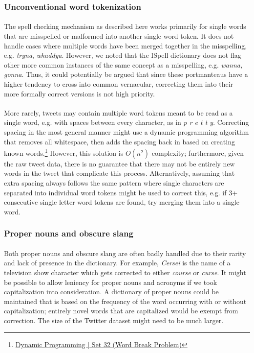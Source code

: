 \documentclass[twocolumn,10pt]{article}
\begin{document}
\subsubsection*{Unconventional word tokenization}
\paragraph{} The spell checking mechanism as described here works primarily for single words that are misspelled or malformed into another single word token. It does not handle cases where multiple words have been merged together in the misspelling, e.g. \textit{tryna}, \textit{whaddya}. However, we noted that the ISpell dictionary does not flag other more common instances of the same concept as a misspelling, e.g. \textit{wanna, gonna}. Thus, it could potentially be argued that since these portmanteaus have a higher tendency to cross into common vernacular, correcting them into their more formally correct versions is not high priority.
\paragraph{} More rarely, tweets may contain multiple word tokens meant to be read as a single word, e.g. with spaces between every character, as in \textit{p r e t t y}. Correcting spacing in the most general manner might use a dynamic programming algorithm that removes all whitespace, then adds the spacing back in based on creating known words.\footnote{\href{http://www.geeksforgeeks.org/dynamic-programming-set-32-word-break-problem/}{Dynamic Programming | Set 32 (Word Break Problem)}} However, this solution is $O(n^2)$ complexity; furthermore, given the raw tweet data, there is no guarantee that there may not be entirely new words in the tweet that complicate this process. Alternatively, assuming that extra spacing always follows the same pattern where single characters are separated into individual word tokens might be used to correct this, e.g. if 3+ consecutive single letter word tokens are found, try merging them into a single word.
\subsubsection*{Proper nouns and obscure slang}
\paragraph{} Both proper nouns and obscure slang are often badly handled due to their rarity and lack of presence in the dictionary. For example, \textit{Cersei} is the name of a television show character which gets corrected to either \textit{course} or \textit{curse}. It might be possible to allow leniency for proper nouns and acronyms if we took capitalization into consideration. A dictionary of proper nouns could be maintained that is based on the frequency of the word occurring with or without capitalization; entirely novel words that are capitalized would be exempt from correction. The size of the Twitter dataset might need to be much larger.
\end{document}
